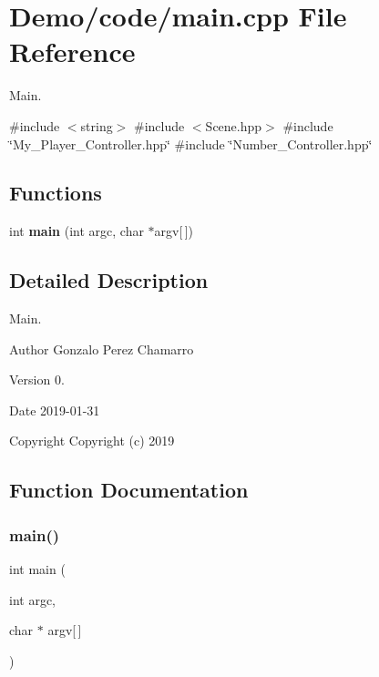 \section{Demo/code/main.cpp File Reference}
\label{main_8cpp}


Main.  


{\ttfamily \#include $<$string$>$}\newline
{\ttfamily \#include $<$Scene.\+hpp$>$}\newline
{\ttfamily \#include \char`\"{}My\+\_\+\+Player\+\_\+\+Controller.\+hpp\char`\"{}}\newline
{\ttfamily \#include \char`\"{}Number\+\_\+\+Controller.\+hpp\char`\"{}}\newline
\subsection*{Functions}
\begin{DoxyCompactItemize}
\item 
int \textbf{ main} (int argc, char $\ast$argv[$\,$])
\end{DoxyCompactItemize}


\subsection{Detailed Description}
Main. 

\begin{DoxyAuthor}{Author}
Gonzalo Perez Chamarro 
\end{DoxyAuthor}
\begin{DoxyVersion}{Version}
0. 
\end{DoxyVersion}
\begin{DoxyDate}{Date}
2019-\/01-\/31
\end{DoxyDate}
\begin{DoxyCopyright}{Copyright}
Copyright (c) 2019 
\end{DoxyCopyright}


\subsection{Function Documentation}
\mbox{\label{main_8cpp_a0ddf1224851353fc92bfbff6f499fa97}} 
\subsubsection{main()}
{\footnotesize\ttfamily int main (\begin{DoxyParamCaption}\item[{int}]{argc,  }\item[{char $\ast$}]{argv[$\,$] }\end{DoxyParamCaption})}

